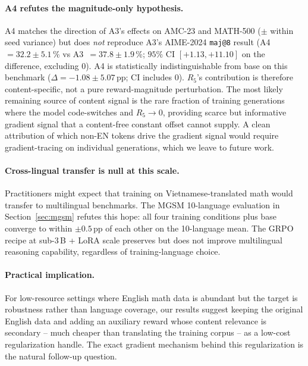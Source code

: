 \documentclass[11pt]{article}
\newcommand{\armC}{\textsc{A3}}
\newcommand{\armD}{\textsc{A4}}
\newcommand{\R}[1]{R_{#1}}
\begin{document}
\paragraph{\armD{} refutes the magnitude-only hypothesis.}
\armD{} matches the direction of \armC{}'s effects on AMC-23 and
MATH-500 ($\pm$ within seed variance) but does \emph{not} reproduce
\armC{}'s AIME-2024 \texttt{maj@8} result (\armD{}~$=32.2 \pm 5.1$\,\%
vs \armC{}~$=37.8 \pm 1.9$\,\%; $95\%$ CI $[+1.13, +11.10]$ on the
difference, excluding $0$). \armD{} is statistically
indistinguishable from base on this benchmark
($\Delta = -1.08 \pm 5.07$\,pp; CI includes $0$). $\R{5}$'s
contribution is therefore content-specific, not a pure
reward-magnitude perturbation. The most likely remaining source of
content signal is the rare fraction of training generations where the
model code-switches and $\R{5} \to 0$, providing scarce but
informative gradient signal that a content-free constant offset cannot
supply. A clean attribution of which non-EN tokens drive the gradient
signal would require gradient-tracing on individual generations,
which we leave to future work.

\paragraph{Cross-lingual transfer is null at this scale.}
Practitioners might expect that training on Vietnamese-translated math
would transfer to multilingual benchmarks. The MGSM 10-language
evaluation in Section~\ref{sec:mgsm} refutes this hope: all four
training conditions plus base converge to within $\pm 0.5$\,pp of each
other on the 10-language mean. The GRPO recipe at sub-3\,B + LoRA
scale preserves but does not improve multilingual reasoning
capability, regardless of training-language choice.

\paragraph{Practical implication.}
For low-resource settings where English math data is abundant but the
target is robustness rather than language coverage, our results suggest
keeping the original English data and adding an auxiliary reward whose
content relevance is secondary -- much cheaper than translating the
training corpus -- as a low-cost regularization handle. The exact
gradient mechanism behind this regularization is the natural follow-up
question.

\end{document}

